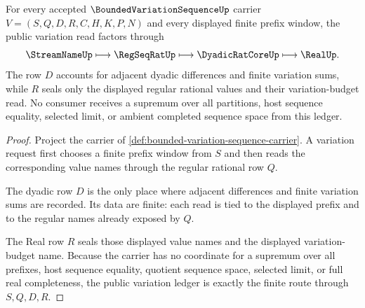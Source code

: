 \begin{theorem}
\label{thm:bounded-variation-sequence-variation-ledger}
For every accepted $\BoundedVariationSequenceUp$ carrier $V=(S,Q,D,R,C,H,K,P,N)$ and every displayed finite prefix window, the public variation read factors through
$$
\StreamNameUp \longmapsto \RegSeqRatUp \longmapsto \DyadicRatCoreUp \longmapsto \RealUp .
$$
The row $D$ accounts for adjacent dyadic differences and finite variation sums, while $R$ seals only the displayed regular rational values and their variation-budget read. No consumer receives a supremum over all partitions, host sequence equality, selected limit, or ambient completed sequence space from this ledger.
\end{theorem}
\begin{proof}
Project the carrier of \autoref{def:bounded-variation-sequence-carrier}. A variation request first chooses a finite prefix window from $S$ and then reads the corresponding value names through the regular rational row $Q$.

The dyadic row $D$ is the only place where adjacent differences and finite variation sums are recorded. Its data are finite: each read is tied to the displayed prefix and to the regular names already exposed by $Q$.

The Real row $R$ seals those displayed value names and the displayed variation-budget name. Because the carrier has no coordinate for a supremum over all prefixes, host sequence equality, quotient sequence space, selected limit, or full real completeness, the public variation ledger is exactly the finite route through $S,Q,D,R$.
\end{proof}

